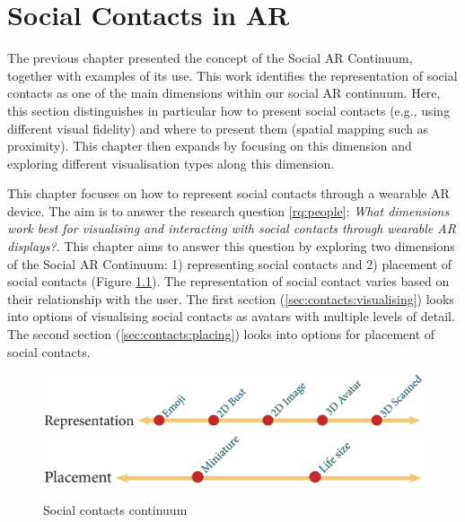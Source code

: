 \chapter{Social Contacts in AR}
\label{ch:contacts} 

The previous chapter presented the concept of the Social AR Continuum, together with examples of its use. This work identifies the representation of social contacts as one of the main dimensions within our social AR continuum. Here, this section distinguishes in particular how to present social contacts (e.g., using different visual fidelity) and where to present them (spatial mapping such as proximity). This chapter then expands by focusing on this dimension and exploring different visualisation types along this dimension. 

This chapter focuses on how to represent social contacts through a wearable AR device. The aim is to answer the research question \ref{rq:people}: \textit{What dimensions work best for visualising and interacting with social contacts through wearable AR displays?}. This chapter aims to answer this question by exploring two dimensions of the Social AR Continuum: 1) representing social contacts and 2) placement of social contacts (Figure \ref{fig:contacts:contacts-continuum}). The representation of social contact varies based on their relationship with the user. 
The first section (\ref{sec:contacts:visualising}) looks into options of visualising social contacts as avatars with multiple levels of detail. The second section (\ref{sec:contacts:placing}) looks into options for placement of social contacts. 

\begin{figure}[ht]
  \centering
  \includegraphics[width=\columnwidth]{images/30-continuum/continuum4_2-01.eps}
  \includegraphics[width=\columnwidth]{images/30-continuum/continuum4_2-02.eps}
  \caption{Social contacts continuum}
  \label{fig:contacts:contacts-continuum}
\end{figure}






